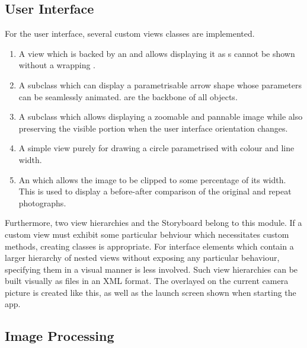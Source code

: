 \subsection{User Interface}

For the user interface, several custom views classes are implemented.
\begin{enumerate}
   \item {} A view which is backed by an  and
      allows displaying it as s cannot be shown without a
      wrapping .
   \item {} A  subclass which can display a
      parametrisable arrow shape whose parameters can be seamlessly animated.
       are the backbone of all  objects.
   \item {} A  subclass which allows
      displaying a zoomable and pannable image while also preserving the visible
      portion when the user interface orientation changes.
   \item {} A simple view purely for drawing a circle parametrised
      with colour and line width.
   \item {} An  which allows the
      image to be clipped to some percentage of its width. This is used to
      display a before-after comparison of the original and repeat photographs.
\end{enumerate}

Furthermore, two view hierarchies and the Storyboard belong to this module.  If
a custom view must exhibit some particular behviour which necessitates custom
methods, creating classes is appropriate. For interface elements which contain a
larger hierarchy of nested views without exposing any particular behaviour,
specifying them in a visual manner is less involved. Such view hierarchies can
be built visually as  files in an XML format. The
 overlayed on the current camera picture is created like
this, as well as the launch screen shown when starting the app.


\subsection{Image Processing}


